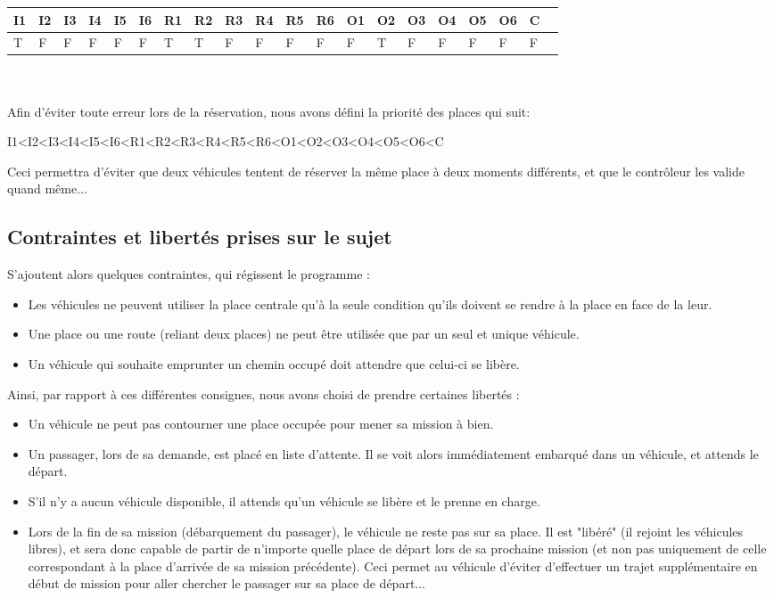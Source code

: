 \documentclass[a4paper, titlepage]{report}
\begin{document}
\begin{tabular}{|l|l|l|l|l|l|l|l|l|l|l|l|l|l|l|l|l|l|l|l|}

\hline
  I1 & I2 & I3 & I4 & I5 & I6 & R1 & R2 & R3 & R4 & R5 & R6 & O1 & O2 & O3 & O4 & O5 & O6 & C \\
  \hline
   T & F & F & F & F & F & T & T & F & F & F & F & F & T & F & F & F & F & F\\
 \hline

\end{tabular}\\
\vspace{0.25cm}\\
Afin d'éviter toute erreur lors de la réservation, nous avons défini la priorité des places qui suit:
\begin{center}
I1<I2<I3<I4<I5<I6<R1<R2<R3<R4<R5<R6<O1<O2<O3<O4<O5<O6<C
\end{center}
Ceci permettra d'éviter que deux véhicules tentent de réserver la même place à deux moments différents, et que le contrôleur les valide quand même...

\subsection{Contraintes et libertés prises sur le sujet}


S'ajoutent alors quelques contraintes, qui régissent le programme :
\begin{itemize}
  \item Les véhicules ne peuvent utiliser la place centrale qu'à la seule condition qu'ils doivent se rendre à la place en face de la leur.
  \item Une place ou une route (reliant deux places) ne peut être utilisée que par un seul et unique véhicule.
  \item Un véhicule qui souhaite emprunter un chemin occupé doit attendre que celui-ci se libère.
\end{itemize}
\vspace{0.25cm}
Ainsi, par rapport à ces différentes consignes, nous avons choisi de prendre certaines libertés :
\vspace{0.25cm}
\begin{itemize}
  \item Un véhicule ne peut pas contourner une place occupée pour mener sa mission à bien.
  \item Un passager, lors de sa demande, est placé en liste d'attente. Il se voit alors immédiatement embarqué dans un véhicule, et attends le départ.
  \item S'il n'y a aucun véhicule disponible, il attends qu'un véhicule se libère et le prenne en charge.
  \item Lors de la fin de sa mission (débarquement du passager), le véhicule ne reste pas sur sa place. Il est "libéré" (il rejoint les véhicules libres), et sera donc capable de partir de n'importe quelle place de départ lors de sa prochaine mission (et non pas uniquement de celle correspondant à la place d'arrivée de sa mission précédente). Ceci permet au véhicule d'éviter d'effectuer un trajet supplémentaire en début de mission pour aller chercher le passager sur sa place de départ...
\end{itemize}
\setcounter{chapter}{0}
\setcounter{section}{0}
\end{document}
